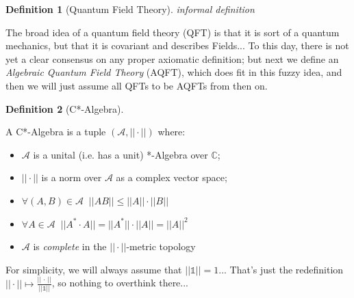 \documentclass[a4paper,11pt]{article}
\numberwithin{equation}{section}
\theoremstyle{definition}
\newtheorem{definition}{Definition}
\newtheorem{comment}{Comment}
\begin{document}
\begin{definition}[Quantum Field Theory] \emph{informal definition}

    The broad idea of a quantum field theory (QFT) is that it is sort of a quantum mechanics, but that it is covariant and describes Fields...
    To this day, there is not yet a clear consensus on any proper axiomatic definition; but next we define an \emph{Algebraic Quantum Field Theory} (AQFT), which does fit in this fuzzy idea, and then we will just assume all QFTs to be AQFTs from then on.
\end{definition}
\begin{definition}[C*-Algebra]
    $\quad$
    
    A C*-Algebra is a tuple $(\mathcal{A}, ||\cdot||)$ where:
    \begin{itemize}
        \item $\mathcal{A}$ is a unital (i.e. has a unit) *-Algebra over $\mathbb{C}$;
        \item $||\cdot||$ is a norm over $\mathcal{A}$ as a complex vector space;
        \item $\forall (A,B)\in\mathcal{A}\;\; ||AB||\leq||A||\cdot||B||$
        \item $\forall A\in\mathcal{A}\;\; ||A^*\cdot A||=||A^*||\cdot||A||=||A||^2$
        \item $\mathcal{A}$ is \emph{complete} in the $||\cdot||$-metric topology
    \end{itemize} 
For simplicity, we will always assume that $||\mathds{1}||=1$... That's just the redefinition $||\cdot||\mapsto\frac{||\,\cdot\,||}{||\mathds{1}||}$, so nothing to overthink there...
\end{definition}

\end{document}
